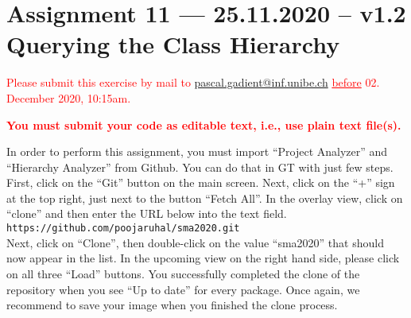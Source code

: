 \documentclass [11pt, a4wide, twoside]{article}
\begin{document}
\section*{Assignment 11 --- 25.11.2020 -- v1.2\\Querying the Class Hierarchy}

\textcolor{red}{Please submit this exercise by mail to \href{mailto:pascal.gadient@inf.unibe.ch}{pascal.gadient@inf.unibe.ch} \underline{before} 02. December 2020, 10:15am.\begin{center}\textbf{You must submit your code as editable text, i.e., use plain text file(s).}\end{center}}



\noindent In order to perform this assignment, you must import ``Project Analyzer'' and ``Hierarchy Analyzer'' from Github. You can do that in GT with just few steps. First, click on the ``Git'' button on the main screen. Next, click on the ``+'' sign at the top right, just next to the button ``Fetch All''. In the overlay view, click on ``clone'' and then enter the URL below into the text field.\\\texttt{https://github.com/poojaruhal/sma2020.git}\\
Next, click on ``Clone'', then double-click on the value ``sma2020'' that should now appear in the list. In the upcoming view on the right hand side, please click on all three ``Load'' buttons. You successfully completed the clone of the repository when you see ``Up to date'' for every package. Once again, we recommend to save your image when you finished the clone process.
\end{document}
